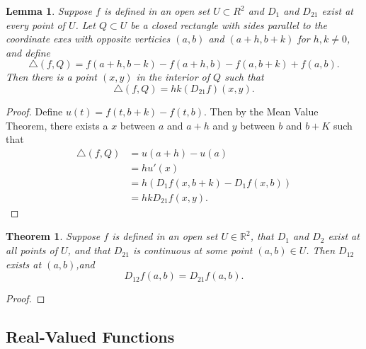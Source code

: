 \documentclass[11pt]{article}
\newtheorem{theorem}{Theorem}
\newtheorem*{lemma*}{Lemma}
\begin{document}
\begin{adjustwidth}{0.5cm}{}
	\begin{lemma*}
		Suppose $f$ is defined in an open set $U \subset R^{2}$ and $D_{1}$ and $D_{21}$ exist at every point of $U$. Let $Q \subset U$ be a closed rectangle with sides parallel to the coordinate exes with opposite verticies $(a, b)$ and $(a + h, b + k)$ for $h, k \ne 0$, and define
		\[
			\triangle (f, Q) = f(a + h, b - k) - f(a + h, b) - f(a, b + k) + f(a, b).
		\]
		Then there is a point $(x, y)$ in the interior of $Q$ such that
		\[
			\triangle(f, Q) = hk(D_{21}f)(x, y).
		\]
	\end{lemma*}
    \begin{proof}\renewcommand{\qedsymbol}{}
		Define $u(t) = f(t, b + k) - f(t, b)$. Then by the Mean Value Theorem, there exists a $x$ between $a$ and $a + h$ and $y$ between $b$ and $b + K$ such that
		\begin{align*}
			\triangle (f, Q) &= u(a + h) - u(a) \\
 							 &= h u'(x) \\
							 &= h(D_{1}f(x, b + k) - D_{1}f(x, b)) \\
							 &= hk D_{21}f(x, y).
		\end{align*}
	\end{proof}
\end{adjustwidth}
\begin{theorem}
	Suppose $f$ is defined in an open set $U \in \mathbb{R}^{2}$, that $D_{1}$ and $D_{2}$ exist at all points of $U$, and that $D_{21}$ is continuous at some point $(a, b) \in U$. Then $D_{12}$ exists at $(a, b)$,and
	\[
		D_{12} f(a, b) = D_{21} f(a, b).
	\]
\end{theorem}
\begin{adjustwidth}{0.5cm}{}
    \begin{proof}\renewcommand{\qedsymbol}{}
		
	\end{proof}
\end{adjustwidth}

\subsection{Real-Valued Functions} 
\end{document}
